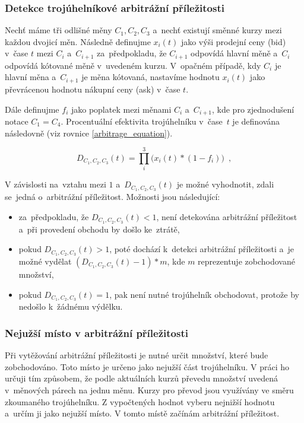 \documentclass[thesis=B,czech]{FITthesis}[2019/03/21]
\begin{document}
\subsubsection{Detekce trojúhelníkové arbitrážní příležitosti}
Nechť máme tři odlišné měny \(C_1,C_2,C_3\) a~nechť existují směnné kurzy mezi každou dvojicí měn. Následně definujme \(x_i(t)\) jako výši prodejní ceny (bid) v~čase \(t\) mezi \(C_i\) a~\(C_{i+1}\) za~předpokladu, že \(C_{i+1}\) odpovídá hlavní měně a~\(C_{i}\) odpovídá kótované měně v~uvedeném kurzu. V~opačném případě, kdy \(C_{i}\) je hlavní měna a~\(C_{i+1}\) je měna kótovaná, nastavíme hodnotu \(x_i(t)\) jako převrácenou hodnotu nákupní ceny (ask) v~čase \(t\).

Dále definujme \(f_i\) jako poplatek mezi měnami \(C_i\) a~\(C_{i+1}\), kde pro zjednodušení notace \(C_1 = C_4\). Procentuální efektivita trojúhelníku v~čase~\(t\) je definována následovně (viz rovnice \ref{arbitrage_equation}).

\begin{equation}
\label{arbitrage_equation}
    D_{C_1,C_2,C_3}(t) = \prod_i^3\Big(x_i(t)*(1-f_i)\Big) \enspace ,
\end{equation}

V závislosti na~vztahu mezi \(1\) a~\(D_{C_1,C_2,C_3}(t)\) je možné vyhodnotit, zdali se~jedná o~arbitrážní příležitost. Možnosti jsou následující:
\begin{itemize}
    \item za~předpokladu, že \(D_{C_1,C_2,C_3}(t) < 1\), není detekována arbitrážní  \linebreak příležitost a~při provedení obchodu by došlo ke~ztrátě,
    \item pokud \(D_{C_1,C_2,C_3}(t) > 1\), poté dochází k~detekci arbitrážní příležitosti a~je možné vydělat \( (D_{C_1,C_2,C_3}(t) - 1) * m\), kde \(m\) reprezentuje zobchodované množství,
    \item pokud \(D_{C_1,C_2,C_3}(t) = 1\), pak není nutné trojúhelník obchodovat, protože by nedošlo k~žádnému výdělku.
\end{itemize}

\subsubsection{Nejužší místo v arbitrážní příležitosti}
Při vytěžování arbitrážní příležitosti je nutné určit množství, které bude zobchodováno. Toto místo je určeno jako nejužší část trojúhelníku. V práci ho určuji tím způsobem, že podle aktuálních kurzů převedu množství uvedená v~měnových párech na jednu měnu. Kurzy pro převod jsou využívány ve směru zkoumaného trojúhelníku. Z vypočtených hodnot vyberu nejnižší hodnotu a~určím ji jako nejužší místo. V tomto místě začínám arbitrážní příležitost. 
\end{document}
